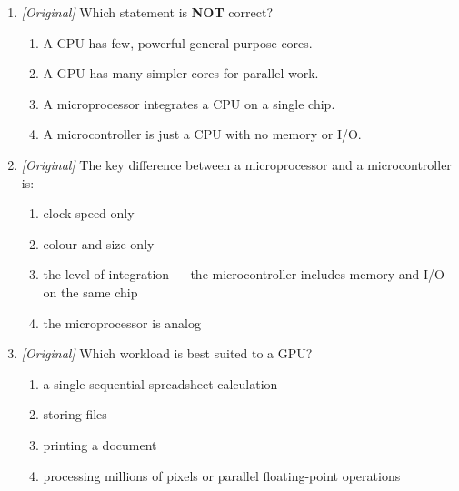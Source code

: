 \begin{enumerate}[label=\textbf{Q\arabic*.}, leftmargin=*]
  \begin{enumerate}[label=\Alph*.]
    \item The CPU must be faulty, because more cores always means faster.
    \item The GPU must be missing.
    \item The clock speed must be zero.
    \item A single-threaded program or a memory/disk-I/O bottleneck --- not
      automatically a ``slow CPU.''
  \end{enumerate}
\item \textit{[Original]} Which statement is \textbf{NOT} correct?
  \begin{enumerate}[label=\Alph*.]
    \item A CPU has few, powerful general-purpose cores.
    \item A GPU has many simpler cores for parallel work.
    \item A microprocessor integrates a CPU on a single chip.
    \item A microcontroller is just a CPU with no memory or I/O.
  \end{enumerate}
\item \textit{[Original]} The key difference between a microprocessor and a
  microcontroller is:
  \begin{enumerate}[label=\Alph*.]
    \item clock speed only
    \item colour and size only
    \item the level of integration --- the microcontroller includes memory
      and I/O on the same chip
    \item the microprocessor is analog
  \end{enumerate}
\item \textit{[Original]} Which workload is best suited to a GPU?
  \begin{enumerate}[label=\Alph*.]
    \item a single sequential spreadsheet calculation
    \item storing files
    \item printing a document
    \item processing millions of pixels or parallel floating-point operations
  \end{enumerate}


\end{enumerate}
